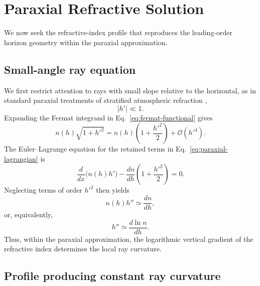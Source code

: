\section{Paraxial Refractive Solution}
\label{sec:paraxial}

We now seek the refractive-index profile that reproduces the leading-order
horizon geometry within the paraxial approximation.

\subsection{Small-angle ray equation}

We first restrict attention to rays with small slope relative to the
horizontal, as in standard paraxial treatments of stratified atmospheric
refraction \cite{nener2003analytical},
\begin{equation}
    |h'|\ll 1.
\end{equation}
Expanding the Fermat integrand in Eq.~\eqref{eq:fermat-functional} gives
\begin{equation}
    n(h)\sqrt{1+h'^2}
    =
    n(h)\left(1+\frac{h'^2}{2}\right)
    +\mathcal{O}(h'^4).
    \label{eq:paraxial-lagrangian}
\end{equation}
The Euler--Lagrange equation for the retained terms in
Eq.~\eqref{eq:paraxial-lagrangian} is
\begin{equation}
    \frac{d}{dx}\bigl(n(h)h'\bigr)
    -\frac{dn}{dh}\left(1+\frac{h'^2}{2}\right)
    =0.
\end{equation}
Neglecting terms of order $h'^2$ then yields
\begin{equation}
    n(h)h''\simeq \frac{dn}{dh},
\end{equation}
or, equivalently,
\begin{equation}
    h''\simeq \frac{d\ln n}{dh}.
    \label{eq:paraxial-ray-equation}
\end{equation}
Thus, within the paraxial approximation, the logarithmic vertical gradient
of the refractive index determines the local ray curvature.

\subsection{Profile producing constant ray curvature}

